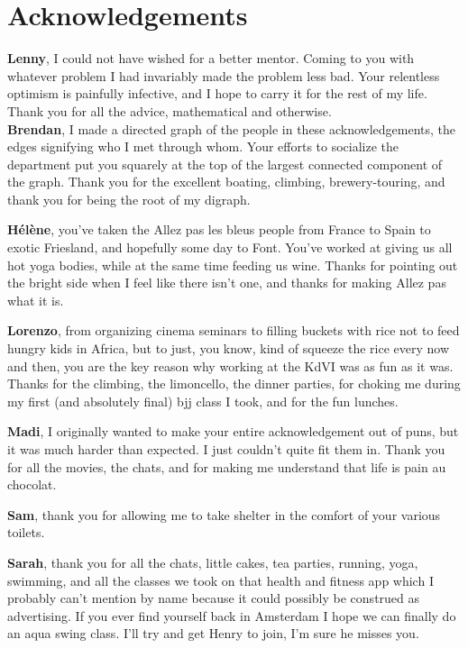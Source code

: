 \chapter*{Acknowledgements}
{\bfseries Lenny}, I could not have wished for a better mentor. Coming to you with whatever problem I had invariably made the problem less bad. Your relentless optimism is painfully infective, and I hope to carry it for the rest of my life. Thank you for all the advice, mathematical and otherwise. \\

{\bfseries Brendan}, I made a directed graph of the people in these acknowledgements, the edges signifying who I met through whom. Your efforts to socialize the department put you squarely at the top of the largest connected component of the graph. Thank you for the excellent boating, climbing, brewery-touring, and thank you for being the root of my digraph.

{\bfseries H\'el\`ene}, you've taken the Allez pas les bleus people from France to Spain to exotic Friesland, and hopefully some day to Font. You've worked at giving us all hot yoga bodies, while at the same time feeding us wine. Thanks for pointing out the bright side when I feel like there isn't one, and thanks for making Allez pas what it is.

{\bfseries Lorenzo}, from organizing cinema seminars to filling buckets with rice not to feed hungry kids in Africa, but to just, you know, kind of squeeze the rice every now and then, you are the key reason why working at the KdVI was as fun as it was. Thanks for the climbing, the limoncello, the dinner parties, for choking me during my first (and absolutely final) bjj class I took, and for the fun lunches.

{\bfseries Madi}, I originally wanted to make your entire acknowledgement out of puns, but it was much harder than expected. I just couldn't quite fit them in. Thank you for all the movies, the chats, and for making me understand that life is pain au chocolat.

{\bfseries Sam}, thank you for allowing me to take shelter in the comfort of your various toilets.

{\bfseries Sarah}, thank you for all the chats, little cakes, tea parties, running, yoga, swimming, and all the classes we took on that health and fitness app which I probably can't mention by name because it could possibly be construed as advertising. If you ever find yourself back in Amsterdam I hope we can finally do an aqua swing class. I'll try and get Henry to join, I'm sure he misses you.

